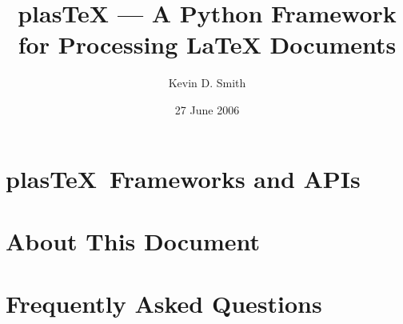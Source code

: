 \documentclass{manual}
\title{plasTeX --- A Python Framework for Processing LaTeX Documents}
\author{Kevin D. Smith}
\date{27 June 2006}
\newcommand{\plasTeX}{plas\TeX}
\begin{document}
\maketitle
\cleardoublepage
\tableofcontents

%

%

%

%

%


\chapter{\plasTeX\ Frameworks and APIs}


%
%
%
%
%
%

\appendix

\chapter{About This Document}



\chapter{Frequently Asked Questions}




\end{document}
